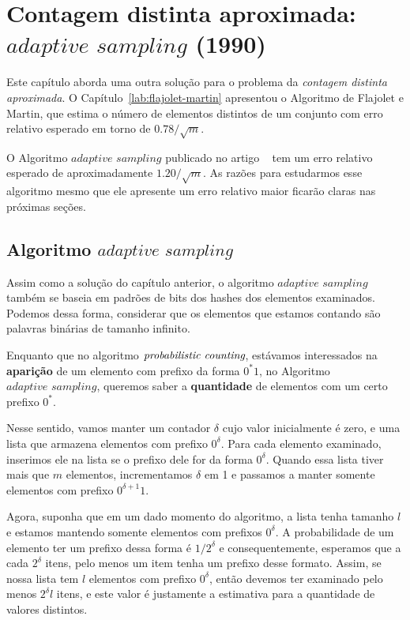 \newcommand{\asampling}{\textit{adaptive sampling}}

\chapter{Contagem distinta aproximada: $\asampling$ (1990)}

Este capítulo aborda uma outra solução para o problema da \textit{contagem distinta aproximada}. O 
Capítulo~\ref{lab:flajolet-martin} apresentou o Algoritmo de Flajolet e Martin, que estima o número de elementos 
distintos de um conjunto com erro relativo esperado em torno de $0.78 / \sqrt{m}$. 

O Algoritmo $\asampling$ publicado no artigo ~\citep{adptive:sampling:90} tem um erro relativo esperado de 
aproximadamente $1.20 / \sqrt{m}$. As razões para estudarmos esse algoritmo mesmo que ele apresente um erro relativo 
maior ficarão claras nas próximas seções.

\section{Algoritmo $\asampling$}
\label{lab:chapter:04:01}

Assim como a solução do capítulo anterior, o algoritmo $\asampling$ também se baseia em padrões de bits dos hashes dos 
elementos examinados. Podemos dessa forma, considerar que os elementos que estamos contando são palavras binárias de 
tamanho infinito. 

Enquanto que no algoritmo $\textit{probabilistic counting}$, estávamos interessados na \textbf{aparição} de um elemento com 
prefixo da forma $0^*1$, no Algoritmo $\asampling$, queremos saber a \textbf{quantidade} de elementos com um certo 
prefixo $0^*$.

Nesse sentido, vamos manter um contador $\delta$ cujo valor inicialmente é zero, e uma lista que armazena elementos com 
prefixo $0^{\delta}$. Para cada elemento examinado, inserimos ele na lista se o prefixo dele for da forma $0^{\delta}$.
Quando essa lista tiver mais que $m$ elementos, incrementamos $\delta$ em 1 e passamos a manter 
somente elementos com prefixo $0^{\delta + 1}1$.

Agora, suponha que em um dado momento do algoritmo, a lista tenha tamanho $l$ e estamos mantendo somente elementos com 
prefixos $0^{\delta}$. A probabilidade de um elemento ter um prefixo dessa forma é $1 / 2^{\delta}$ e consequentemente,
esperamos que a cada $2^{\delta}$ itens, pelo menos um item tenha um prefixo desse formato. Assim, se nossa lista tem
$l$ elementos com prefixo $0^{\delta}$, então devemos ter examinado pelo menos $2^{\delta} l$ itens, e este valor é 
justamente a estimativa para a quantidade de valores distintos.

